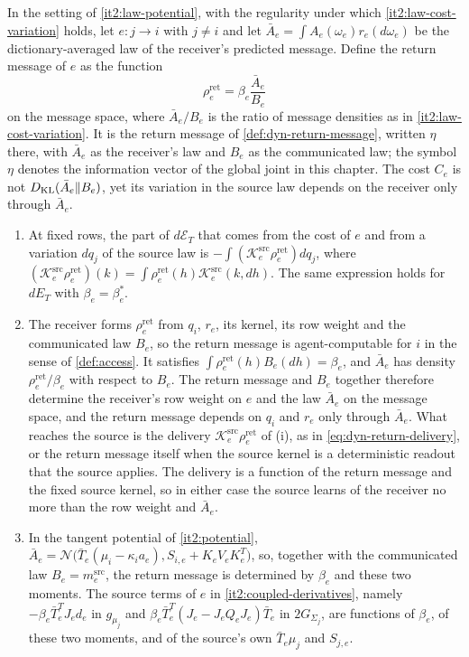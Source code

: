 In the setting of \cref{it2:law-potential}, with the regularity under which \cref{it2:law-cost-variation} holds, let $e:j\to i$ with $j\neq i$ and let $\bar A_e=\int A_e(\omega_e)r_e(d\omega_e)$ be the dictionary-averaged law of the receiver's predicted message. Define the return message of $e$ as the function
\begin{equation}
\rho_e^{\mathrm{ret}}=\beta_e\frac{\bar A_e}{B_e}
\label{it2:return-message-eq}
\end{equation}
on the message space, where $\bar A_e/B_e$ is the ratio of message densities as in \cref{it2:law-cost-variation}. It is the return message of \cref{def:dyn-return-message}, written $\eta$ there, with $\bar A_e$ as the receiver's law and $B_e$ as the communicated law; the symbol $\eta$ denotes the information vector of the global joint in this chapter. The cost $C_e$ is not $D_{\mathrm{KL}}(\bar A_e\Vert B_e)$, yet its variation in the source law depends on the receiver only through $\bar A_e$.
\begin{enumerate}
\item[(i)] At fixed rows, the part of $d\mathcal E_T$ that comes from the cost of $e$ and from a variation $dq_j$ of the source law is $-\int(\mathcal K_e^{\mathrm{src}}\rho_e^{\mathrm{ret}})dq_j$, where $(\mathcal K_e^{\mathrm{src}}\rho_e^{\mathrm{ret}})(k)=\int\rho_e^{\mathrm{ret}}(h)\mathcal K_e^{\mathrm{src}}(k,dh)$. The same expression holds for $dE_T$ with $\beta_e=\beta_e^*$.
\item[(ii)] The receiver forms $\rho_e^{\mathrm{ret}}$ from $q_i$, $r_e$, its kernel, its row weight and the communicated law $B_e$, so the return message is agent-computable for $i$ in the sense of \cref{def:access}. It satisfies $\int\rho_e^{\mathrm{ret}}(h)B_e(dh)=\beta_e$, and $\bar A_e$ has density $\rho_e^{\mathrm{ret}}/\beta_e$ with respect to $B_e$. The return message and $B_e$ together therefore determine the receiver's row weight on $e$ and the law $\bar A_e$ on the message space, and the return message depends on $q_i$ and $r_e$ only through $\bar A_e$. What reaches the source is the delivery $\mathcal K_e^{\mathrm{src}}\rho_e^{\mathrm{ret}}$ of (i), as in \cref{eq:dyn-return-delivery}, or the return message itself when the source kernel is a deterministic readout that the source applies. The delivery is a function of the return message and the fixed source kernel, so in either case the source learns of the receiver no more than the row weight and $\bar A_e$.
\item[(iii)] In the tangent potential of \cref{it2:potential}, $\bar A_e=\mathcal N\bigl(\bar T_e(\mu_i-\kappa_ia_e),S_{i,e}+K_eV_eK_e^T\bigr)$, so, together with the communicated law $B_e=m_e^{\mathrm{src}}$, the return message is determined by $\beta_e$ and these two moments. The source terms of $e$ in \cref{it2:coupled-derivatives}, namely $-\beta_e\bar T_e^TJ_ed_e$ in $g_{\mu_j}$ and $\beta_e\bar T_e^T(J_e-J_eQ_eJ_e)\bar T_e$ in $2G_{\Sigma_j}$, are functions of $\beta_e$, of these two moments, and of the source's own $\bar T_e\mu_j$ and $S_{j,e}$.
\end{enumerate}
